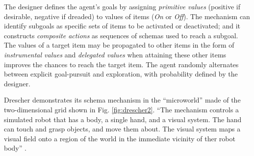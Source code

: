 \documentclass[runningheads]{llncs}
\begin{document}
The designer defines the agent's goals by assigning \textit{primitive values} (positive if desirable, negative if dreaded) to values of items (\textit{On} or \textit{Off}).
The mechanism can identify subgoals as specific sets of items to be activated or deactivated; 
and it constructs \textit{composite actions} as sequences of schemas used to reach a subgoal.
The values of a target item may be propagated to other items in the form of \textit{instrumental values} and \textit{delegated values} when attaining these other items improves the chances to reach the target item. 
The agent randomly alternates between explicit goal-pursuit and exploration, with probability defined by the designer.





Drescher demonstrates its schema mechanism in the ``microworld'' made of the two-dimensional grid shown in Fig. \ref{fig:drescher2}.
``The mechanism controls a simulated robot that has a body, a single hand, and a visual system. 
The hand can touch and grasp objects, and move them about.
The visual system maps a visual field onto a region of the world in the immediate vicinity of ther robot body'' \cite[p. 114]{drescher_made-up_1991}. 
\end{document}
